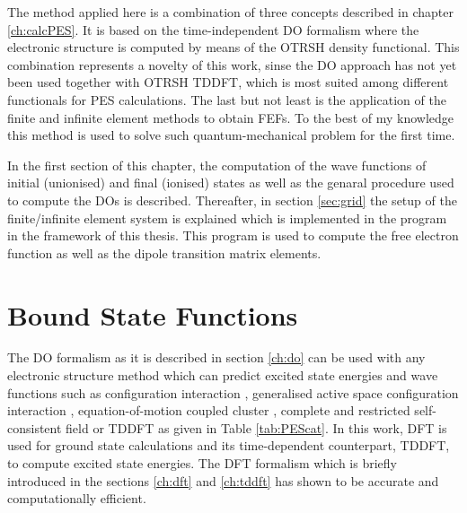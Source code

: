 \label{ch:proced}
The method applied here is a combination of three concepts described in chapter \ref{ch:calcPES}.
It is based on the time-independent DO formalism where the electronic structure is computed by means of the OTRSH density functional.
This combination represents a novelty of this work, sinse the DO approach has not yet been used together with OTRSH TDDFT, which is most suited among different functionals for PES calculations.
The last but not least is the application of the finite and infinite element methods to obtain FEFs.
To the best of my knowledge this method is used to solve such quantum-mechanical problem for the first time.

In the first section of this chapter, the computation of the wave functions of initial (unionised) and final (ionised) states as well as the genaral procedure used to compute the DOs is described.
Thereafter, in section \ref{sec:grid} the setup of the finite/infinite element system is explained which is implemented in the program  \cite{FreeWilly} in the framework of this thesis.
This program is used to compute the free electron function as well as the dipole transition matrix elements.

\section{Bound State Functions}
The DO formalism as it is described in section \ref{ch:do} can be used with any electronic structure method which can predict excited state energies and wave functions such as configuration interaction \cite{ci1}, generalised active space configuration interaction \cite{bauch1}, equation-of-motion coupled cluster \cite{CAPccEOM,eomCCdo}, complete and restricted self-consistent field \cite{MAgg,GrellKuehn,asscf1,asscf2} or TDDFT as given in Table \ref{tab:PEScat}.
In this work, DFT is used for ground state calculations and its time-dependent counterpart, TDDFT, to compute excited state energies.
The DFT formalism which is briefly introduced in the sections \ref{ch:dft} and \ref{ch:tddft} has shown to be accurate and computationally efficient.


